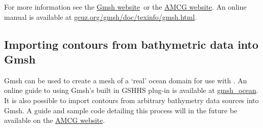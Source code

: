 For more information see the \href{http://geuz.org/gmsh/}{Gmsh website}\ or the \href{http://amcg.ese.ic.ac.uk}{AMCG
website}. An online manual is available at \href{http://geuz.org/gmsh/doc/texinfo/gmsh.html}{geuz.org/gmsh/doc/texinfo/gmsh.html}.

\subsection{Importing contours from bathymetric data into Gmsh}

Gmsh can be used to create a mesh of a `real' ocean domain for use with \fluidity. An online guide to using Gmsh's built in
GSHHS plug-in is available at \href{http://perso.uclouvain.be/jonathan.lambrechts/gmsh_ocean/}{gmsh\_ocean}.
It is also possible to import contours from arbitrary bathymetry data sources into Gmsh. A guide and sample code detailing this process will
in the future be available on the \href{http://amcg.ese.ic.ac.uk}{AMCG website}.
